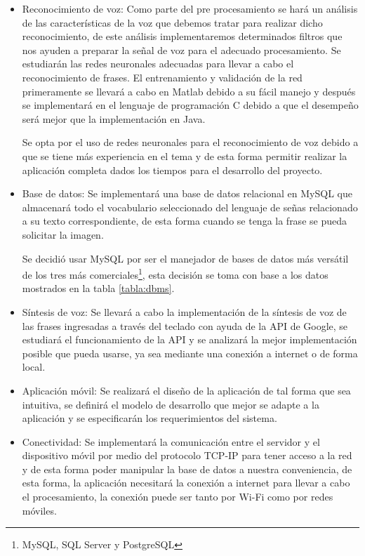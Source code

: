 	\begin{itemize}
		\item Reconocimiento de voz: Como parte del pre procesamiento se hará un análisis de las características de la voz que debemos tratar para realizar dicho reconocimiento, de este análisis implementaremos determinados filtros que nos ayuden a preparar la señal de voz para el adecuado procesamiento. Se estudiarán las redes neuronales adecuadas para llevar a cabo el reconocimiento de frases. El entrenamiento y validación de la red primeramente se llevará a cabo en Matlab debido a su fácil manejo y después se implementará en el lenguaje de programación C debido a que el desempeño será mejor que la implementación en Java.

		Se opta por el uso de redes neuronales para el reconocimiento de voz debido a que se tiene más experiencia en el tema y de esta forma permitir realizar la aplicación completa dados los tiempos para el desarrollo del proyecto.

		\item Base de datos: Se implementará una base de datos relacional en MySQL que almacenará todo el vocabulario seleccionado del lenguaje de señas relacionado a su texto correspondiente, de esta forma cuando se tenga la frase se pueda solicitar la imagen.

		Se decidió usar MySQL por ser el manejador de bases de datos más versátil de los tres más comerciales\footnote{MySQL, SQL Server y PostgreSQL}, esta decisión se toma con base a los datos mostrados en la tabla \ref{tabla:dbms}.

		\item Síntesis de voz: Se llevará a cabo la implementación de la síntesis de voz de las  frases ingresadas a través del teclado con ayuda de la API de Google, se estudiará el funcionamiento de la API y se analizará la mejor implementación posible que pueda usarse, ya sea mediante una conexión a internet o de forma local.

		\item Aplicación móvil: Se realizará el diseño de la aplicación de tal forma que sea intuitiva, se definirá el modelo de desarrollo que mejor se adapte a la aplicación y se especificarán los requerimientos del sistema.

		\item Conectividad: Se implementará la comunicación entre el servidor y el dispositivo móvil por medio del protocolo TCP-IP para tener acceso a la red y de esta forma poder manipular la base de datos a nuestra conveniencia, de esta forma, la aplicación necesitará la conexión a internet para llevar a cabo el procesamiento, la conexión puede ser tanto por Wi-Fi como por redes móviles.


\end{itemize}
